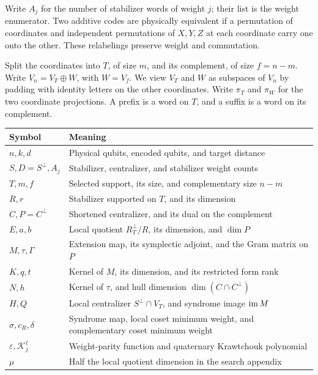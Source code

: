 Write \(A_j\) for the number of stabilizer words of weight \(j\); their
list is the weight enumerator. Two additive codes are physically equivalent
if a permutation of coordinates and independent permutations of
\(X,Y,Z\) at each coordinate carry one onto the other. These relabelings
preserve weight and commutation.

Split the coordinates into \(T\), of size \(m\), and its complement,
of size \(f=n-m\). Write \(V_n=V_T\oplus W\), with \(W=V_f\).
We view \(V_T\) and \(W\) as subspaces of \(V_n\) by padding with
identity letters on the other coordinates. Write \(\pi_T\) and
\(\pi_W\) for the two coordinate projections. A prefix is a word on
\(T\), and a suffix is a word on its complement.

\begin{center}\small
\begin{tabularx}{\linewidth}{@{}lX@{}}\toprule
Symbol&Meaning\\\midrule
\(n,k,d\)&Physical qubits, encoded qubits, and target distance\\
\(S,D=S^\perp,A_j\)&Stabilizer, centralizer, and stabilizer weight counts\\
\(T,m,f\)&Selected support, its size, and complementary size \(n-m\)\\
\(R,r\)&Stabilizer supported on \(T\), and its dimension\\
\(C,P=C^\perp\)&Shortened centralizer, and its dual on the complement\\
\(E,a,b\)&Local quotient \(R_T^\perp/R\), its dimension, and \(\dim P\)\\
\(M,\tau,\Gamma\)&Extension map, its symplectic adjoint, and the Gram matrix on \(P\)\\
\(K,q,t\)&Kernel of \(M\), its dimension, and its restricted form rank\\
\(N,h\)&Kernel of \(\tau\), and hull dimension \(\dim(C\cap C^\perp)\)\\
\(H,Q\)&Local centralizer \(S^\perp\cap V_T\), and syndrome image \(\operatorname{im} M\)\\
\(\sigma,c_R,\delta\)&Syndrome map, local coset minimum weight, and complementary coset minimum weight\\
\(\varepsilon,\mathcal{K}_j^\ell\)&Weight-parity function and quaternary Krawtchouk polynomial\\
\(\mu\)&Half the local quotient dimension in the search appendix\\\bottomrule
\end{tabularx}
\end{center}

